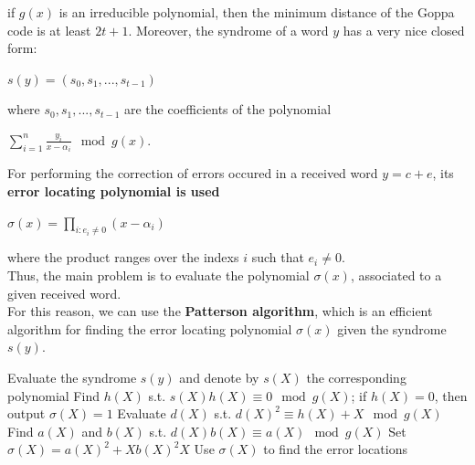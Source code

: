\noindent
if $g(x)$ is an irreducible polynomial, then the minimum distance of the Goppa code is at least $2t + 1$. Moreover, the syndrome of a word $y$ has a very nice closed form:
\begin{center}
    $s(y) = (s_0, s_1, ..., s_{t-1})$
\end{center}
\noindent
where $s_0, s_1, ..., s_{t-1}$ are the coefficients of the polynomial
\begin{center}
    $\sum_{i=1}^n \frac{y_i}{x - \alpha_i} \mod g(x)$.
\end{center}
\medskip

\noindent
For performing the correction of errors occured in a received word $y = c + e$, its \textbf{error locating polynomial is used}
\begin{center}
    $\sigma(x) = \prod_{i : e_i \neq 0} (x - \alpha_i)$
\end{center}
\noindent
where the product ranges over the indexs $i$ such that $e_i \neq 0$.\\
Thus, the main problem is to evaluate the polynomial $\sigma(x)$, associated to a given received word.\\
For this reason, we can use the \textbf{Patterson algorithm}, which is an efficient algorithm for finding the error locating polynomial $\sigma(x)$ given the syndrome $s(y)$.


\begin{algorithm}
\caption{Patterson Algorithm }
\begin{algorithmic}[1]

\State Evaluate the syndrome $s(y)$ and denote by $s(X)$ the corresponding polynomial
\State Find $h(X)$ s.t. $s(X)h(X) \equiv 0 \mod g(X)$; if $h(X) = 0$, then output $\sigma(X) = 1$
\State Evaluate $d(X)$ s.t. $d(X)^2 \equiv h(X) + X \mod g(X)$
\State Find $a(X)$ and $b(X)$ s.t. $d(X)b(X) \equiv a(X) \mod g(X)$
\State Set $\sigma(X) = a(X)^2 + X b(X)^2X$
\State Use $\sigma(X)$ to find the error locations
\end{algorithmic}
\end{algorithm}

